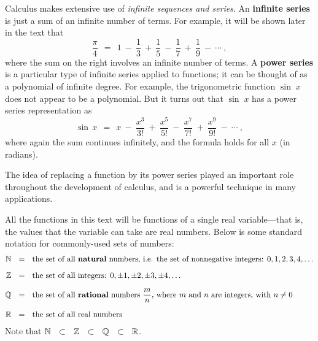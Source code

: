 Calculus makes extensive use of \emph{infinite sequences and
series}. An
\textbf{infinite series} is just a sum of an infinite number of terms. For
example, it will be shown later in the text that
\begin{equation}\label{eqn:piseries}
 \frac{\pi}{4} ~~=~~ 1 ~-~ \frac{1}{3} ~+~ \frac{1}{5} ~-~ \frac{1}{7} ~+~
 \frac{1}{9} ~-~ \cdots ~,
\end{equation}
where the sum on the right involves an infinite number of terms. A \textbf{power
series} is a particular type of infinite series applied to
functions; it can be thought of as a polynomial of infinite degree. For example,
the trigonometric function $\sin\;x$ does not appear to be a polynomial. But it
turns out that $\sin\;x$ has a power series representation as
\begin{equation}\label{eqn:sinseries}
 \sin\,x ~~=~~ x ~-~ \frac{x^3}{3!} ~+~ \frac{x^5}{5!} ~-~ \frac{x^7}{7!} ~+~
 \frac{x^9}{9!} ~-~ \cdots ~,
\end{equation}
where again the sum continues infinitely, and the formula holds for all $x$ (in
radians).

The idea of replacing a function by its power series played an important role
throughout the development of calculus, and is a powerful technique in many
applications.

All the functions in this text will be functions of a single real
variable---that is, the values that the variable can take are real
numbers. Below is some standard notation for commonly-used sets
of numbers:
\begin{align*}
 \mathbb{N} ~~&=~~ \text{the set of all \textbf{natural} numbers, i.e. the set of
  nonnegative integers: } 0, 1, 2, 3, 4, \ldots\\[6pt]
 \mathbb{Z} ~~&=~~ \text{the set of all integers: } 0, \pm 1, \pm 2, \pm 3,
  \pm 4, \ldots\\[6pt]
 \mathbb{Q} ~~&=~~ \text{the set of all \textbf{rational} numbers $\frac{m}{n}$,
  where $m$ and $n$ are integers, with $n \ne 0$}\\[6pt]
 \mathbb{R} ~~&=~~ \text{the set of all real numbers}
\end{align*}
Note that $\mathbb{N} ~~\subset~~ \mathbb{Z} ~~\subset~~ \mathbb{Q} ~~\subset~~
\mathbb{R}$.

